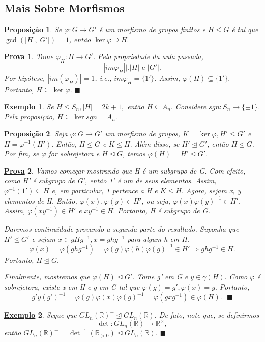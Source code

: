 \documentclass{article}
\newtheorem*{prop*}{\underline{Proposi\c c\~ao}}
\newtheorem{example*}{\underline{Exemplo}}
\newtheorem*{proof*}{\underline{Prova}}
\renewcommand\qedsymbol{$\blacksquare$}
\begin{document}
\subsection{Mais Sobre Morfismos}
\begin{prop*}
  Se $\varphi:G\rightarrow G'$ \'e um morfismo de grupos finitos e $H\leq{G}$ \'e tal que  $\gcd{(|H|, |G'|)} = 1$, ent\~ao $\ker{\varphi}\supseteq{H}.$
\end{prop*}
\begin{proof*}
  Tome $\varphi_{H}:H\rightarrow G'$. Pela propriedade da aula passada, 
    $$
    |im{\varphi_{H}}|\biggl|_{}^{}\biggr. |H|\text{ e } |G'|.
    $$
    Por hip\'otese, $|im(\varphi_{H})|=1$, i.e., $im \varphi_{H} = \{1'\}$. Assim, $\varphi(H)\subseteq{\{1'\}}.$
    Portanto, $H\subseteq{\ker{\varphi}}.$ \qedsymbol
\end{proof*}
\begin{example*}
  Se $H\leq{S_{n}}, |H| = 2k+1,$ ent\~ao $H\subseteq{A_{n}}.$ Considere $sgn:S_{n}\rightarrow \{\pm1\}$. Pela proposi\c c\~ao,
  $H\subseteq{\ker{sgn}}=A_{n}.$
\end{example*}
\begin{prop*}
  Seja $\varphi:G\rightarrow G'$ um morfismo de grupos, $K=\ker{\varphi}, H'\leq{G'}$ e $H = \varphi^{-1}(H').$ Ent\~ao, 
 $H\leq{G}$ e $K\leq{H}.$ Al\'em disso, se $H'\trianglelefteq{G'}$, ent\~ao $H\trianglelefteq{G}$. Por fim, se $\varphi$ for
 sobrejetora e $H\trianglelefteq{G}$, temos $\varphi(H) = H'\trianglelefteq{G'}.$
\end{prop*}
\begin{proof*}
  Vamos come\c car mostrando que H \'e um subgrupo de G. Com efeito, como H' \'e subgrupo de G', ent\~ao 1' \'e um de seus elementos.
Assim, $\varphi^{-1}(1')\subseteq{H}$ e, em particular, 1 pertence a H e $K\leq{H}.$ Agora, sejam x, y elementos de H. Ent\~ao,
 $\varphi(x), \varphi(y)\in H'$, ou seja, $\varphi(x)\varphi(y)^{-1}\in H'$. Assim, $\varphi(xy^{-1})\in H'$ e $xy^{-1}\in H.$
Portanto, H \'e subgrupo de G.

  Daremos continuidade provando a segunda parte do resultado. Suponha que $H'\trianglelefteq{G'}$ e sejam $x\in gHg^{-1}, x = ghg^{-1}$ 
para algum h em H. 
  $$
    \varphi(x) = \varphi(ghg^{-1}) = \varphi(g)\varphi(h)\varphi(g)^{-1}\in H' \Rightarrow ghg^{-1}\in H.
  $$
Portanto, $H\trianglelefteq{G}.$

  Finalmente, mostremos que $\varphi(H)\trianglelefteq{G'}.$ Tome g' em G e $y\in\gamma(H).$ Como $\varphi$ \'e sobrejetora, existe
x em H e g em G tal que $\varphi(g)=g', \varphi(x) = y.$ Portanto,
  $$
  g'y(g')^{-1} = \varphi(g)\varphi(x)\varphi(g)^{-1} = \varphi(gxg^{-1})\in \varphi(H).\text{ \qedsymbol}
  $$
\end{proof*}
\begin{example*}
  Segue que $GL_{n}(\mathbb{R})^{+}\trianglelefteq{GL_{n}(\mathbb{R})}$. De fato, note que, se definirmos
    $$
      \det:GL_{n}(\mathbb{R})\rightarrow \mathbb{R}^{\times},
    $$
    ent\~ao $GL_{n}(\mathbb{R})^{+} = \det^{-1}(\mathbb{R}_{>0})\trianglelefteq{GL_{n}(\mathbb{R})}$. \qedsymbol
\end{example*}
\end{document}
